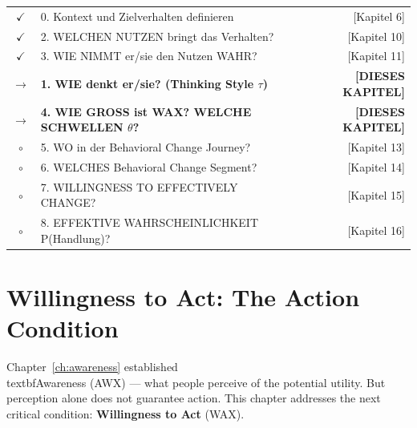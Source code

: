 

\begin{tcolorbox}[
  title={\textbf{Die 9 Fragen des EBF — Kapitelnavigation}},
  colback=blue!3,
  colframe=blue!50!black,
  fonttitle=\bfseries\sffamily,
  coltitle=white,
  boxrule=0.8pt,
  arc=2mm
]
\small\sffamily
\begin{tabular}{@{}clr@{}}
$\checkmark$ & 0. Kontext und Zielverhalten definieren & [Kapitel 6] \\
$\checkmark$ & 2. WELCHEN NUTZEN bringt das Verhalten? & [Kapitel 10] \\
$\checkmark$ & 3. WIE NIMMT er/sie den Nutzen WAHR? & [Kapitel 11] \\[3pt]
\rowcolor{blue!10}
$\rightarrow$ & \textbf{1. WIE denkt er/sie? (Thinking Style $\tau$)} & \textbf{[DIESES KAPITEL]} \\
\rowcolor{blue!10}
$\rightarrow$ & \textbf{4. WIE GROSS ist WAX? WELCHE SCHWELLEN $\theta$?} & \textbf{[DIESES KAPITEL]} \\[3pt]
$\circ$ & 5. WO in der Behavioral Change Journey? & [Kapitel 13] \\
$\circ$ & 6. WELCHES Behavioral Change Segment? & [Kapitel 14] \\
$\circ$ & 7. WILLINGNESS TO EFFECTIVELY CHANGE? & [Kapitel 15] \\
$\circ$ & 8. EFFEKTIVE WAHRSCHEINLICHKEIT P(Handlung)? & [Kapitel 16] \\
\end{tabular}
\end{tcolorbox}

\section{Willingness to Act: The Action Condition}
\label{sec:willingness-intro}

Chapter~\ref{ch:awareness} established \\textbf{Awareness} (AWX) — what people perceive 
of the potential utility. But perception alone does not guarantee action. 
This chapter addresses the next critical condition: \textbf{Willingness to Act} (WAX).

